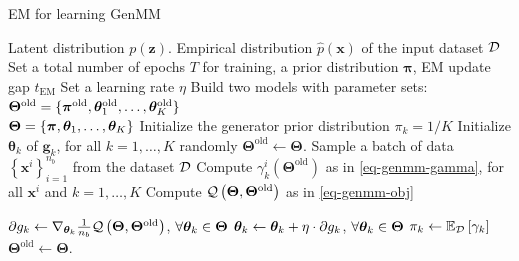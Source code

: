 \begin{algorithm}[tp]
  \caption{EM for learning GenMM}\label{flow-algo-em}
  \begin{algorithmic}[1]
    Latent distribution $p(\bm{z})$. Empirical distribution $\hat{p}(\bm{x})$ of the input dataset $\mathcal{D}$
    \STATE Set a total number of epochs $T$ for training, a prior distribution $\bm{\pi}$, EM update gap $t_{\mathrm{EM}}$
    \STATE  Set a learning rate $\eta$ 
    \STATE Build two models with parameter sets:\\
    ${\bm{\Theta}}^{\mathrm{old}}=\{ \bm{\pi}^{\mathrm{old}},
    \bm{\theta}_1^{\mathrm{old}},\hdots,
    \bm{\theta}_K^{\mathrm{old}} \}$\\
     ${\bm{\Theta}} = \{ \bm{\pi},
    \bm{\theta}_1,\hdots, \bm{\theta}_K \}$
    \STATE Initialize the generator prior distribution $\pi_k = 1/K$
    \STATE Initialize $\bm{\theta}_k$ of $\bm{g}_k$, for all $k=1,\dots,K$ randomly 
    \STATE $\bm{\Theta}^{\mathrm{old}} \gets \bm{\Theta}$.
    \STATE Sample a batch of data $\left\{ \bm{x}^{i}
    \right\}_{i=1}^{n_b}$ from the dataset $\mathcal{D}$ 
    \STATE Compute $\gamma_k^{i}(\bm{\Theta}^{\mathrm{old}})$ as in \eqref{eq-genmm-gamma},
    for all $\bm{x}^{i}$ and $k=1, \dots, K$
    \STATE Compute
    $\mathcal{Q}\left(\bm{\Theta},\bm{\Theta}^{\mathrm{old}}\right)$ as in \eqref{eq-genmm-obj}%
    
    \STATE $\partial{g_k} \gets \nabla_{\bm{\theta}_k} \frac{1}{n_{b}}\mathcal{Q}\left(
      \bm{\Theta}, \bm{\Theta}^{\mathrm{old}}\right)$,
    $\forall \bm{\theta}_k \in \bm{\Theta}$
    \STATE $\bm{\theta}_k \gets \bm{\theta}_k + \eta \cdot \partial{g_k}$, $\forall \bm{\theta}_k \in \bm{\Theta}$
    \ENDFOR
    \STATE $\pi_k \gets \mathbb{E}_{\mathcal{D}}\left[ \gamma_k \right]$ %
    \STATE $\bm{\Theta}^{\mathrm{old}} \gets \bm{\Theta}$.
    \ENDIF
    \ENDFOR
  \end{algorithmic}
\end{algorithm}


